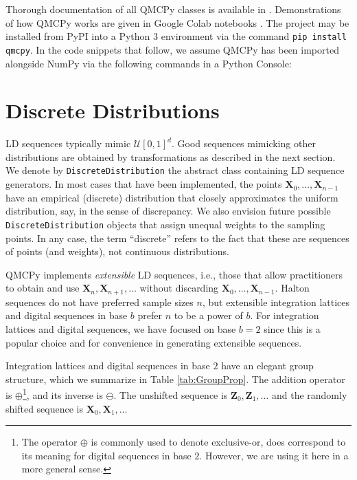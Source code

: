 \documentclass[graybox]{svmult}
\begin{document}
Thorough documentation of all QMCPy classes is available in \cite{QMCPyDocs}. Demonstrations of how QMCPy works are given in Google Colab notebooks \cite{QMCPyTutColab2020,QMCPyTutColab2020_paper}. The project may be installed from PyPI into a Python 3 environment via the command \texttt{pip install qmcpy}. In the code snippets that follow, we assume QMCPy has been imported alongside NumPy \cite{numpy} via the following commands in a Python Console:


\section{Discrete Distributions}

LD sequences typically mimic $\mathcal{U}[0,1]^d$.  Good sequences mimicking other distributions are obtained by transformations as described in the next section.  We denote by \texttt{DiscreteDistribution} the abstract class containing LD sequence generators.  In most cases that have been implemented, the points $\boldsymbol{X}_0, \ldots, \boldsymbol{X}_{n-1}$ have an empirical (discrete) distribution that closely approximates the uniform distribution, say, in the sense of discrepancy.  We also envision future possible \texttt{DiscreteDistribution} objects that assign unequal weights to the sampling points.  In any case, the term ``discrete'' refers to the fact that these are sequences of points (and weights), not continuous distributions.

QMCPy implements \emph{extensible} LD sequences, i.e., those that allow practitioners to obtain and use $\boldsymbol{X}_n, \boldsymbol{X}_{n+1}, \ldots $ without discarding $\boldsymbol{X}_0, \ldots, \boldsymbol{X}_{n-1}$.  Halton sequences do not have preferred sample sizes $n$, but extensible integration lattices and digital sequences in base $b$ prefer $n$ to be a power of $b$.  For integration lattices and digital sequences, we have focused on base $b=2$ since this is a popular choice and for convenience in generating extensible sequences.

Integration lattices and digital sequences in base $2$ have an elegant group structure, which we summarize in Table \ref{tab:GroupProp}.  The addition operator  is $\oplus$\footnote{The operator $\oplus$ is commonly used to denote exclusive-or, does correspond to its meaning for digital sequences in base $2$.  However, we are using it here in a more general sense.}, and its inverse is $\ominus$.  The unshifted sequence is $\boldsymbol{Z}_0, \boldsymbol{Z}_1, \ldots$ and the randomly shifted sequence is $\boldsymbol{X}_0, \boldsymbol{X}_1, \ldots$
\end{document}
